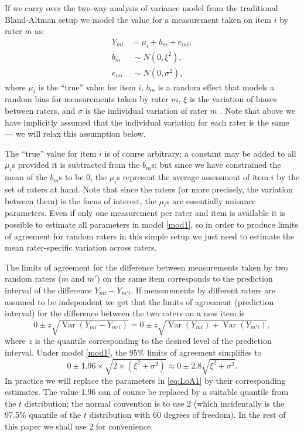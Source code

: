 \documentclass[aoas]{imsart}
\newcommand{\V}{\operatorname{Var}}
\begin{document}
If we carry over the two-way analysis of variance model from the
traditional Bland-Altman setup we model the value for a
measurement taken on item $i$ by rater $m$ as:
\begin{equation} \label{mod1}
\begin{split}
Y_{mi} &= \mu_i + b_m + e_{mi}, \\
b_m &~ \sim N(0, \xi^2), \\
e_{mi} &~ \sim N(0, \sigma^2),
\end{split}
\end{equation}
where $\mu_i$ is the ``true'' value for item $i$, $b_m$ is a random
effect that models a random bias for measurements taken by rater $m$,
$\xi$ is the variation of biases between raters, and $\sigma$ is the
individual variation of rater $m$
\citep{Bland:Altman.1999,Carstensen.2008b}. Note that above we have
implicitly assumed that the individual variation for each rater is the
same --- we will relax this assumption below.

The ``true'' value for item $i$ is of course arbitrary; a constant may
be added to all $\mu_i$s provided it is subtracted from the $b_m$s;
but since we have constrained the mean of the $b_m$s to be 0, the
$\mu_i$s represent the average assessment of item $i$ by the set of
raters at hand. Note that since the raters (or more precisely, the
variation between them) is the focus of interest, the $\mu_i$s are
essentially nuisance parameters. Even if only one measurement per
rater and item is available it is possible to estimate all parameters
in model \eqref{mod1}, so in order to produce limits of agreement for
random raters in this simple setup we just need to estimate the mean rater-specific
variation across raters.

The limits of agreement for the difference between measurements taken
by two random raters ($m$ and $m'$) on the same item corresponds to
the prediction interval of the difference $Y_{mi} - Y_{m'i}$.  If
measurements by different raters are assumed to be independent we get
that the limits of agreement (prediction interval) for the
difference between the two raters on a new item is
\begin{equation}
0 \pm z \sqrt{\V(Y_{mi} - Y_{m'i})} = 0 \pm z \sqrt{\V(Y_{mi}) + \V(Y_{m'i})},
\end{equation}
where $z$ is the quantile corresponding to the desired level of the
prediction interval. Under model \eqref{mod1}, the 95\% limits of
agreement simplifies to
\begin{equation}
  0 \pm 1.96 \times \sqrt{2\times(\xi^2 + \sigma^2)} \approx 0 \pm 2.8
  \sqrt{\xi^2 + \sigma^2}. \label{eq:LoA1}
\end{equation}
In practice we will replace the parameters in \eqref{eq:LoA1} by their
corresponding estimates. The value 1.96 can of course be replaced by
a suitable quantile from the $t$ distribution; the normal convention
is to use 2 (which incidentally is the 97.5\% quantile of the $t$
distribution with 60 degrees of freedom). In the rest of this paper we
shall use 2 for convenience.
\end{document}
